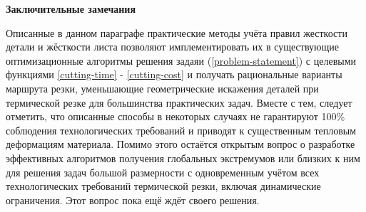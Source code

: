 \documentclass{article}
\begin{document}
{\bf Заключительные замечания}

Описанные в данном параграфе практические методы учёта
правил жесткости детали и жёсткости листа позволяют
имплементировать их в существующие оптимизационные
алгоритмы решения задаяи (\ref{problem-statement})
с целевыми функциями \ref{cutting-time} - \ref{cutting-cost}
и получать рациональные варианты маршрута резки,
уменьшающие геометрические искажения деталей
при термической резке для большинства практических задач.
Вместе с тем, следует отметить,
что описанные способы в некоторых случаях не гарантируют 100\%
соблюдения технологических требований и
приводят к существенным тепловым деформациям материала.
Помимо этого остаётся открытым вопрос о разработке
эффективных алгоритмов получения глобальных экстремумов или
близких к ним для решения задач большой размерности с
одновременным учётом всех технологических требований
термической резки, включая динамические ограничения.
Этот вопрос  пока ещё ждёт своего решения.
\end{document}
